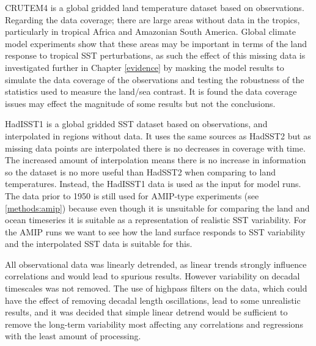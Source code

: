 CRUTEM4 is a global gridded land temperature dataset based on observations.  
Regarding the data coverage; there are large areas without data in the tropics, 
particularly in tropical Africa and Amazonian South America. Global climate 
model experiments show that these areas may be important in terms of the land 
response to tropical SST perturbations, as such the effect of this missing data 
is investigated further in Chapter \ref{evidence} by masking the model results 
to simulate the data coverage of the observations and testing the robustness of 
the statistics used to measure the land/sea contrast. It is found the data 
coverage issues may effect the magnitude of some results but not the 
conclusions.

HadISST1 is a global gridded SST dataset based on observations, and interpolated 
in regions without data. It uses the same sources as HadSST2 but as missing data 
points are interpolated there is no decreases in coverage with time. The 
increased amount of interpolation means there is no increase in information so 
the dataset is no more useful than HadSST2 when comparing to land temperatures.  
Instead, the HadISST1 data is used as the input for model runs. The data prior 
to 1950 is still used for AMIP-type experiments (see \ref{methods:amip}) because 
even though it is unsuitable for comparing the land and ocean timeseries	it 
is suitable as a representation of realistic SST variability. For the AMIP runs 
we want to see how the land surface responds to SST variability and the 
interpolated SST data is suitable for this.

All observational data was linearly detrended, as linear trends strongly 
influence correlations and would lead to spurious results. However variability 
on decadal timescales was not removed. The use of highpass filters on the data, 
which could have the effect of removing decadal length oscillations, lead to 
some unrealistic results, and it was decided that simple linear detrend would be 
sufficient to remove the long-term variability most affecting any correlations 
and regressions with the least amount of processing.



